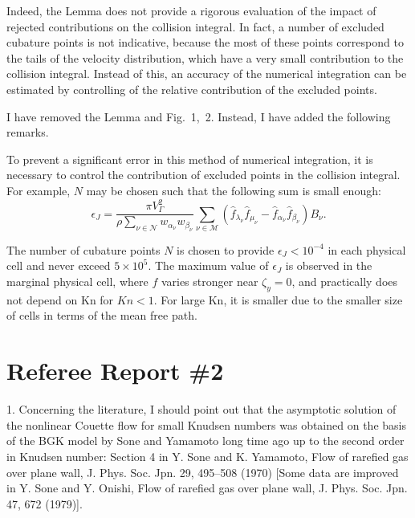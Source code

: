 \documentclass{article}
\newcommand{\Kn}{\mathrm{Kn}}
\newcommand{\Nu}{\mathcal{N}}
\newcommand{\Mu}{\mathcal{M}}
\def\asterism{\par\vspace{1em}{\centering\scalebox{1}{\bfseries *~*~*}\par}\vspace{.5em}\par}
\begin{document}
Indeed, the Lemma does not provide a rigorous evaluation of the impact of rejected contributions
on the collision integral. In fact, a number of excluded cubature points is not indicative,
because the most of these points correspond to the tails of the velocity distribution,
which have a very small contribution to the collision integral.
Instead of this, an accuracy of the numerical integration can be estimated
by controlling of the relative contribution of the excluded points.

I have removed the Lemma and Fig.~1,~2. Instead, I have added the following remarks.

\begin{leftbar}
To prevent a significant error in this method of numerical integration,
it is necessary to control the contribution of excluded points in the collision integral.
For example, \(N\) may be chosen such that the following sum is small enough:
\begin{equation}\label{eq:excluded_contribution}
    \epsilon_J = \frac{\pi V_\Gamma^2}{\rho\sum_{\nu\in\Nu} w_{\alpha_\nu}w_{\beta_\nu}}
        \sum_{\nu\in\Mu} \left(
            \hat{f}_{\lambda_\nu}\hat{f}_{\mu_\nu} - \hat{f}_{\alpha_\nu}\hat{f}_{\beta_\nu}
        \right)B_\nu.
\end{equation}

\asterism

The number of cubature points \(N\) is chosen to provide \(\epsilon_J<10^{-4}\)
in each physical cell and never exceed \(5\times10^5\).
The maximum value of \(\epsilon_J\) is observed in the marginal physical cell,
where \(f\) varies stronger near \(\zeta_y = 0\), and practically does not depend on \(\Kn\) for \(Kn<1\).
For large \(\Kn\), it is smaller due to the smaller size of cells in terms of the mean free path.
\end{leftbar}

\section{Referee Report \#2}

\begin{quoting}
1. Concerning the literature, I should point out that the asymptotic solution of the nonlinear Couette flow for small Knudsen numbers
was obtained on the basis of the BGK model by Sone and Yamamoto long time ago up to the second order in Knudsen number:
Section 4 in Y. Sone and K. Yamamoto, Flow of rarefied gas over plane wall, J. Phys. Soc. Jpn. 29, 495--508 (1970)
[Some data are improved in Y. Sone and Y. Onishi, Flow of rarefied gas over plane wall, J. Phys. Soc. Jpn. 47, 672 (1979)].
\end{quoting}
\end{document}
